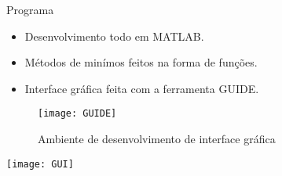 \begin{frame}[t]{Programa}
\vspace{-9mm}
\begin{block}{}
\begin{itemize}
\item Desenvolvimento todo em MATLAB.
\vspace{1mm}
\item Métodos de minímos feitos na forma de funções.
\vspace{1mm}
\item Interface gráfica feita com a ferramenta GUIDE.
\end{itemize}
\vspace{-3mm}
\begin{figure}[H]
	\begin{center}
		\texttt{[image: GUIDE]}   
		\vspace{-0.15cm}
		\caption{Ambiente de desenvolvimento de interface gráfica}
		\label{fig:GUIDE}
	\end{center}
\end{figure}

\end{block}
\end{frame}
\begin{frame}{}
\vspace{0mm}
\hspace{4mm}
\texttt{[image: GUI]}
\end{frame}